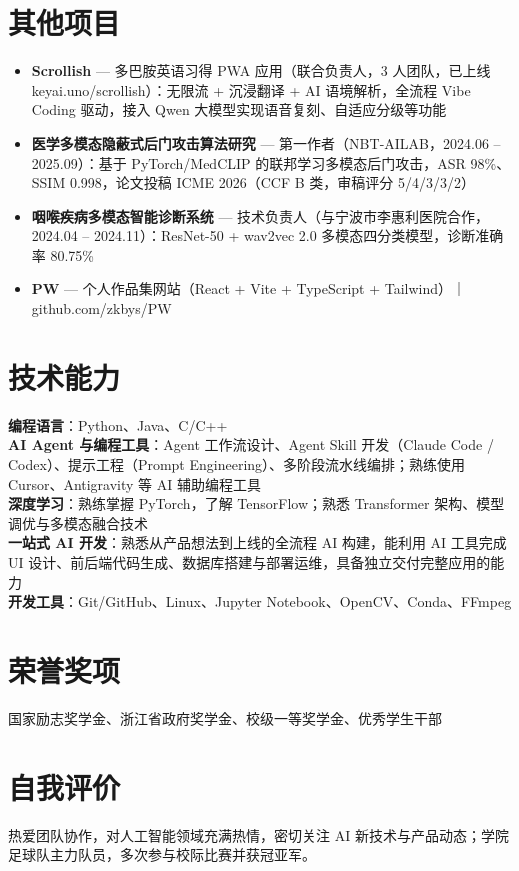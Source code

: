 \documentclass[a4paper,11pt]{article}
\newcommand{\resumeItem}[1]{
  \item\small{
    {#1 \vspace{-2pt}}
  }
}
\newcommand{\resumeSubHeadingListStart}{\begin{itemize}[leftmargin=0.15in, label={}]}
\newcommand{\resumeSubHeadingListEnd}{\end{itemize}}
\begin{document}
\section{其他项目}
  \resumeSubHeadingListStart
    \resumeItem{\textbf{Scrollish} — 多巴胺英语习得 PWA 应用（联合负责人，3 人团队，已上线 keyai.uno/scrollish）：无限流 + 沉浸翻译 + AI 语境解析，全流程 Vibe Coding 驱动，接入 Qwen 大模型实现语音复刻、自适应分级等功能}
    \resumeItem{\textbf{医学多模态隐蔽式后门攻击算法研究} — 第一作者（NBT-AILAB，2024.06 – 2025.09）：基于 PyTorch/MedCLIP 的联邦学习多模态后门攻击，ASR 98\%、SSIM 0.998，论文投稿 ICME 2026（CCF B 类，审稿评分 5/4/3/3/2）}
    \resumeItem{\textbf{咽喉疾病多模态智能诊断系统} — 技术负责人（与宁波市李惠利医院合作，2024.04 – 2024.11）：ResNet-50 + wav2vec 2.0 多模态四分类模型，诊断准确率 80.75\%}
    \resumeItem{\textbf{PW} — 个人作品集网站（React + Vite + TypeScript + Tailwind）｜ github.com/zkbys/PW}
  \resumeSubHeadingListEnd


\section{技术能力}
 \begin{itemize}[leftmargin=0.15in, label={}]
    \small{\item{
     \textbf{编程语言}：Python、Java、C/C++ \\
     \textbf{AI Agent 与编程工具}：Agent 工作流设计、Agent Skill 开发（Claude Code / Codex）、提示工程（Prompt Engineering）、多阶段流水线编排；熟练使用 Cursor、Antigravity 等 AI 辅助编程工具 \\
     \textbf{深度学习}：熟练掌握 PyTorch，了解 TensorFlow；熟悉 Transformer 架构、模型调优与多模态融合技术 \\
     \textbf{一站式 AI 开发}：熟悉从产品想法到上线的全流程 AI 构建，能利用 AI 工具完成 UI 设计、前后端代码生成、数据库搭建与部署运维，具备独立交付完整应用的能力 \\
     \textbf{开发工具}：Git/GitHub、Linux、Jupyter Notebook、OpenCV、Conda、FFmpeg
    }}
 \end{itemize}


\section{荣誉奖项}
 \begin{itemize}[leftmargin=0.15in, label={}]
    \small{\item{
     国家励志奖学金、浙江省政府奖学金、校级一等奖学金、优秀学生干部
    }}
 \end{itemize}


\section{自我评价}
 \begin{itemize}[leftmargin=0.15in, label={}]
    \small{\item{
     热爱团队协作，对人工智能领域充满热情，密切关注 AI 新技术与产品动态；学院足球队主力队员，多次参与校际比赛并获冠亚军。
    }}
 \end{itemize}


\end{document}
